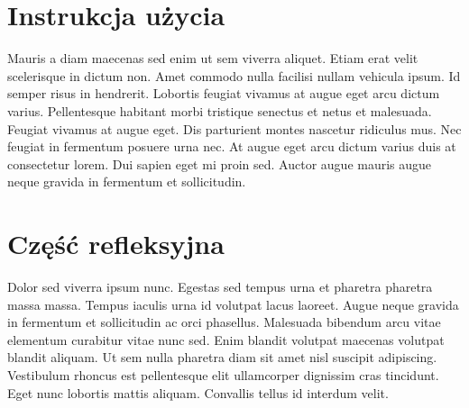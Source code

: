 \documentclass[12pt, titlepage]{article}
\begin{document}
\section{Instrukcja użycia}
Mauris a diam maecenas sed enim ut sem viverra aliquet. Etiam erat velit scelerisque in dictum non. Amet commodo nulla facilisi nullam vehicula ipsum. Id semper risus in hendrerit. Lobortis feugiat vivamus at augue eget arcu dictum varius. Pellentesque habitant morbi tristique senectus et netus et malesuada. Feugiat vivamus at augue eget. Dis parturient montes nascetur ridiculus mus. Nec feugiat in fermentum posuere urna nec. At augue eget arcu dictum varius duis at consectetur lorem. Dui sapien eget mi proin sed. Auctor augue mauris augue neque gravida in fermentum et sollicitudin.

\section{Część refleksyjna}
Dolor sed viverra ipsum nunc. Egestas sed tempus urna et pharetra pharetra massa massa. Tempus iaculis urna id volutpat lacus laoreet. Augue neque gravida in fermentum et sollicitudin ac orci phasellus. Malesuada bibendum arcu vitae elementum curabitur vitae nunc sed. Enim blandit volutpat maecenas volutpat blandit aliquam. Ut sem nulla pharetra diam sit amet nisl suscipit adipiscing. Vestibulum rhoncus est pellentesque elit ullamcorper dignissim cras tincidunt. Eget nunc lobortis mattis aliquam. Convallis tellus id interdum velit.
\end{document}
